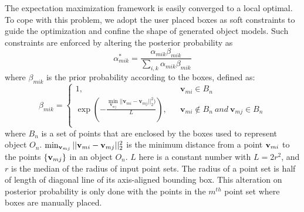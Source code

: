 The expectation maximization framework is easily converged to a local optimal. 
%
To cope with this problem, we adopt the user placed boxes as soft constraints to guide the optimization and confine the shape of generated object models. 
Such constraints are enforced by altering the posterior probability as
\begin{equation}
	\label{equ:alteralpha}
	\alpha_{mik}^*=\frac{\alpha_{mik}\beta_{mik}}{\sum_{i,k}\alpha_{mik}\beta_{mik}}
\end{equation}
%
where $\beta_{mik}$ is the prior probability according to the boxes, defined as:
\begin{equation}
	\beta_{mik}=\left\{
	\begin{array}{lcl}
		1,& &\mathbf v_{mi} \in B_n\\
		\exp(-\frac{\min_{\mathbf v_{mj}}|| \mathbf v_{mi} - \mathbf v_{mj} ||_2^2  )}{L}),& &\mathbf v_{mi} \notin B_n~and~\mathbf v_{mj} \in B_n\\
	\end{array} \right.
\end{equation}
%
where $B_n$ is a set of points that are enclosed by the boxes used to represent object $O_{n}$. 
%
$\min_{\mathbf{v}_{mj}}|| \mathbf{v}_{mi} - \mathbf{v}_{mj} ||_2^2$ is the minimum distance from a point $\mathbf{v}_{mi}$ to the points $\{\mathbf{v}_{mj}\}$ in an object $O_n$.
$L$ here is a constant number with $L=2r^2$, and $r$ is the median of the radius of input point sets. 
%
The radius of a point set is half of length of diagonal line of its axis-aligned bounding box.   
%
This alteration on posterior probability is only done with the points in the $m^{th}$ point set where boxes are manually placed. 
%



